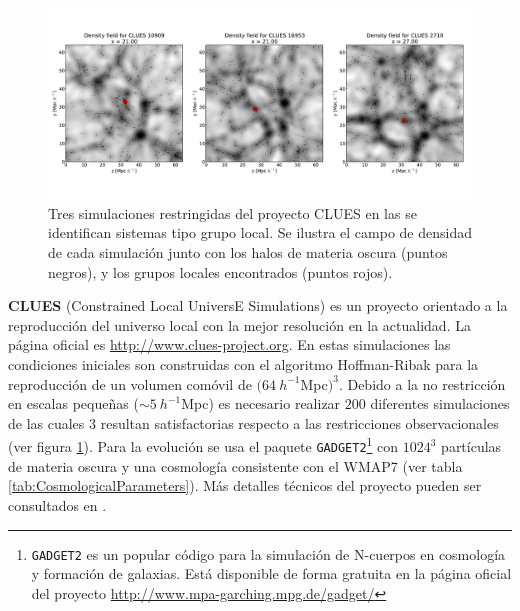 \begin{figure}[htbp]
	\centering
	\includegraphics[width=1.0\textwidth]
	{./figures/3_nbody_simulations/CLUES_Simulations.pdf}

	\caption{\small{Tres simulaciones restringidas del proyecto CLUES 
	en las se identifican sistemas tipo grupo local. Se ilustra el campo 
	de densidad de cada simulación junto con los halos de materia oscura
	(puntos negros), y los grupos locales encontrados (puntos rojos).}}
	
	\label{fig:CLUES_Right}
\end{figure}


\textbf{CLUES} (Constrained Local UniversE Simulations) es un proyecto 
orientado a la reproducción del universo local con la mejor resolución 
en la actualidad. La página oficial es \url{http://www.clues-project.org}. 
En estas simulaciones las condiciones iniciales son construidas con el 
algoritmo Hoffman-Ribak \cite{Hoffman1991} para la reproducción de un 
volumen comóvil de $(64\ h^{-1}$Mpc$)^{3}$. Debido a la no restricción en
escalas pequeñas ($\sim 5\ h^{-1}$Mpc) es necesario realizar $200$ 
diferentes simulaciones de las cuales $3$ resultan satisfactorias 
respecto a las restricciones observacionales (ver figura 
\ref{fig:CLUES_Right}). Para la evolución se usa el paquete 
\texttt{GADGET2}\footnote{\texttt{GADGET2} es un popular código para la 
simulación de N-cuerpos en cosmología y formación de galaxias. Está 
disponible de forma gratuita en la página oficial del proyecto 
\url{http://www.mpa-garching.mpg.de/gadget/}} con $1024^3$ partículas de
materia oscura y una cosmología consistente con el WMAP7 (ver tabla 
\ref{tab:CosmologicalParameters}). Más detalles técnicos del proyecto
pueden ser consultados en \cite{Gottloeber2010}.


